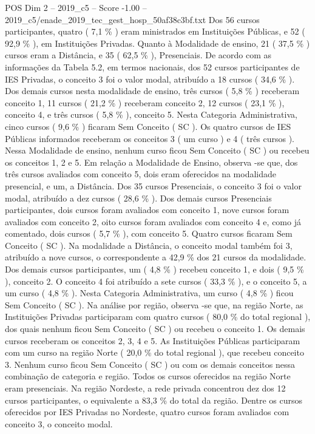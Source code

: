 \begin{textsample}{POS Dim 2 – 2019\_c5 – Score -1.00 – 2019\_c5/enade\_2019\_tec\_gest\_hosp\_50af38c3bf.txt}
Dos 56 cursos participantes, quatro ( 7,1 \% ) eram ministrados em Instituições Públicas, e 52 ( 92,9 \% ), em Instituições Privadas.
Quanto à Modalidade de ensino, 21 ( 37,5 \% ) cursos eram a Distância, e 35 ( 62,5 \% ), Presenciais.
De acordo com as informações da Tabela 5.2, em termos nacionais, dos 52 cursos participantes de IES Privadas, o conceito 3 foi o valor modal, atribuído a 18 cursos ( 34,6 \% ).
Dos demais cursos nesta modalidade de ensino, três cursos ( 5,8 \% ) receberam conceito 1, 11 cursos ( 21,2 \% ) receberam conceito 2, 12 cursos ( 23,1 \% ), conceito 4, e três cursos ( 5,8 \% ), conceito 5.
Nesta Categoria Administrativa, cinco cursos ( 9,6 \% ) ficaram Sem Conceito ( SC ).
Os quatro cursos de IES Públicas informados receberam os conceitos 3 ( um curso ) e 4 ( três cursos ).
Nessa Modalidade de ensino, nenhum curso ficou Sem Conceito ( SC ) ou recebeu os conceitos 1, 2 e 5.
Em relação a Modalidade de Ensino, observa -se que, dos três cursos avaliados com conceito 5, dois eram oferecidos na modalidade presencial, e um, a Distância.
Dos 35 cursos Presenciais, o conceito 3 foi o valor modal, atribuído a dez cursos ( 28,6 \% ).
Dos demais cursos Presenciais participantes, dois cursos foram avaliados com conceito 1, nove cursos foram avaliados com conceito 2, oito cursos foram avaliados com conceito 4 e, como já comentado, dois cursos ( 5,7 \% ), com conceito 5.
Quatro cursos ficaram Sem Conceito ( SC ).
Na modalidade a Distância, o conceito modal também foi 3, atribuído a nove cursos, o correspondente a 42,9 \% dos 21 cursos da modalidade.
Dos demais cursos participantes, um ( 4,8 \% ) recebeu conceito 1, e dois ( 9,5 \% ), conceito 2.
O conceito 4 foi atribuído a sete cursos ( 33,3 \% ), e o conceito 5, a um curso ( 4,8 \% ).
Nesta Categoria Administrativa, um curso ( 4,8 \% ) ficou Sem Conceito ( SC ).
Na análise por região, observa -se que, na região Norte, as Instituições Privadas participaram com quatro cursos ( 80,0 \% do total regional ), dos quais nenhum ficou Sem Conceito ( SC ) ou recebeu o conceito 1.
Os demais cursos receberam os conceitos 2, 3, 4 e 5.
As Instituições Públicas participaram com um curso na região Norte ( 20,0 \% do total regional ), que recebeu conceito 3.
Nenhum curso ficou Sem Conceito ( SC ) ou com os demais conceitos nessa combinação de categoria e região.
Todos os cursos oferecidos na região Norte eram presenciais.
Na região Nordeste, a rede privada concentrou dez dos 12 cursos participantes, o equivalente a 83,3 \% do total da região.
Dentre os cursos oferecidos por IES Privadas no Nordeste, quatro cursos foram avaliados com conceito 3, o conceito modal.

\end{textsample}
